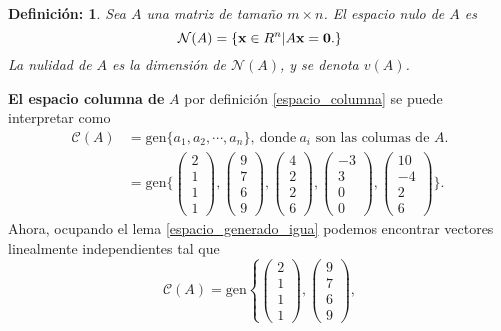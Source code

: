 \documentclass[11pt,letterpaper]{article}
\newcommand{\mcC}{\mathcal{C}}
\newcommand{\mcN}{\mathcal{N}}
\newcommand{\gen}{\text{gen}}
\newtheorem{thmd}{Definición:}
\begin{document}
\begin{enumerate}
\begin{framed}
    \begin{thmd} \label{espacio_nulo}
    Sea $A$ una matriz de tamaño $m\times n$. El espacio nulo de $A$ es
    $$\mathcal{N}(A)=\{ \textbf{x}\in R^n | A\bf \textbf{x}=\textbf{0}.\}$$
    La nulidad de $A$ es la dimensión de $\mcN(A)$, y se denota $v(A)$.
    \end{thmd}
\end{framed} 
\textbf{El espacio columna de} $A$ por definición \ref{espacio_columna} se puede interpretar como
\begin{align*}
\mcC(A)&=\gen\{a_1, a_2,\cdots , a_n\}, \ \text{donde} \ a_i \text{ son las columas de }A.\\
&=\gen\{\begin{pmatrix}2\\1\\1\\1\end{pmatrix},
\begin{pmatrix} 9\\7\\6\\9\end{pmatrix},
\begin{pmatrix}4\\2\\2\\6\end{pmatrix},
\begin{pmatrix}-3\\3\\0\\0 \end{pmatrix},
\begin{pmatrix}10\\-4\\2\\6 \end{pmatrix} \}.
\end{align*}
Ahora, ocupando el lema \ref{espacio_generado_igua} podemos encontrar vectores linealmente independientes tal que 
$$\mcC(A)=\gen\left\{\begin{pmatrix}2\\1\\1\\1\end{pmatrix},
\begin{pmatrix} 9\\7\\6\\9\end{pmatrix},
$$
\end{enumerate}
\end{document}
